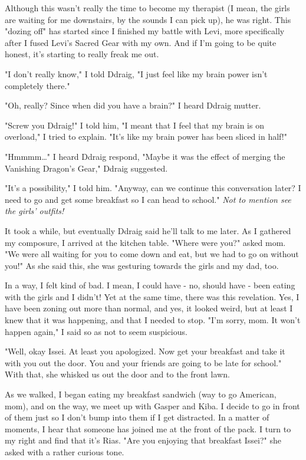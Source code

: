 \documentclass{article}
\begin{document}
Although this wasn't really the time to become my therapist (I mean, the girls are waiting for me downstairs, by the sounds I can pick up), he was right. This "dozing off" has started since I finished my battle with Levi, more specifically after I fused Levi's Sacred Gear with my own. And if I'm going to be quite honest, it's starting to really freak me out. 

"I don't really know," I told Ddraig, "I just feel like my brain power isn't completely there."

"Oh, really? Since when did you have a brain?" I heard Ddraig mutter.

"Screw you Ddraig!" I told him, "I meant that I feel that my brain is on overload," I tried to explain. "It's like my brain power has been sliced in half!"

"Hmmmm…" I heard Ddraig respond, "Maybe it was the effect of merging the Vanishing Dragon's Gear," Ddraig suggested.

"It's a possibility," I told him. "Anyway, can we continue this conversation later? I need to go and get some breakfast so I can head to school." \emph{Not to mention see the girls' outfits!}

It took a while, but eventually Ddraig said he'll talk to me later. As I gathered my composure, I arrived at the kitchen table. "Where were you?" asked mom. "We were all waiting for you to come down and eat, but we had to go on without you!" As she said this, she was gesturing towards the girls and my dad, too.

In a way, I felt kind of bad. I mean, I could have - no, should have - been eating with the girls and I didn't! Yet at the same time, there was this revelation. Yes, I have been zoning out more than normal, and yes, it looked weird, but at least I knew that it was happening, and that I needed to stop. "I'm sorry, mom. It won't happen again," I said so as not to seem suspicious.

"Well, okay Issei. At least you apologized. Now get your breakfast and take it with you out the door. You and your friends are going to be late for school." With that, she whisked us out the door and to the front lawn.

As we walked, I began eating my breakfast sandwich (way to go American, mom), and on the way, we meet up with Gasper and Kiba. I decide to go in front of them just so I don't bump into them if I get distracted. In a matter of moments, I hear that someone has joined me at the front of the pack. I turn to my right and find that it's Rias. "Are you enjoying that breakfast Issei?" she asked with a rather curious tone.
\end{document}
